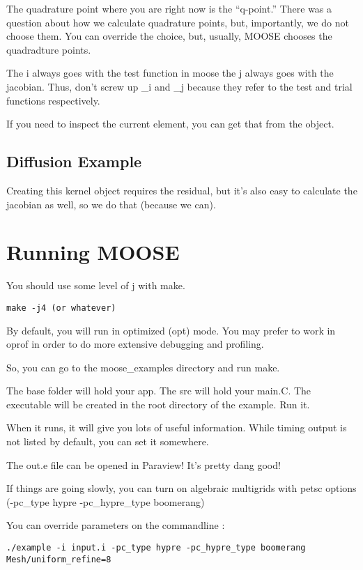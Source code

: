 The quadrature point where you are right now is the ``q-point.'' There was a 
question about how we calculate quadrature points, but, importantly, we do not 
choose them. You can override the choice, but, usually, MOOSE chooses the 
quadradture points.  

The i always goes with the test function in moose the j always goes with the 
jacobian. Thus, don't screw up \_i and \_j because they refer to the test and 
trial functions respectively. 

If you need to inspect the current element, you can get that from the object. 

\subsection{Diffusion Example}

Creating this kernel object requires the residual, but it's also easy to 
calculate the jacobian as well, so we do that (because we can). 




\section{Running MOOSE}

You should use some level of j with make. 

\begin{verbatim}
make -j4 (or whatever)
\end{verbatim}

By default, you will run in optimized (opt) mode. You may prefer to work in 
oprof in order to do more extensive debugging and profiling. 

So, you can go to the moose\_examples directory and run make.

The base folder will hold your app. The src will hold your main.C. The 
executable will be created in the root directory of the example. Run it.

When it runs, it will give you lots of useful information. While timing output 
is not listed by default, you can set it somewhere. 

The out.e file can be opened in Paraview! It's pretty dang good!


If things are going slowly, you can turn on algebraic multigrids with petsc 
options (-pc\_type hypre -pc\_hypre\_type boomerang)


You can override parameters on the commandline :

\begin{verbatim}
./example -i input.i -pc_type hypre -pc_hypre_type boomerang Mesh/uniform_refine=8
\end{verbatim}


